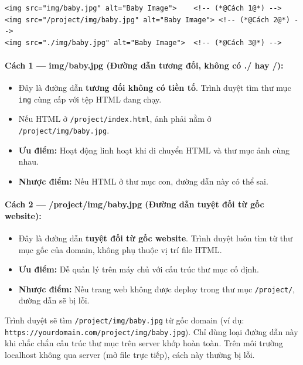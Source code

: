\documentclass[11pt,oneside]{book}
\newcommand{\codeinline}[1]{\textcolor{accentOrange}{\texttt{#1}}}
\begin{document}
\begin{codeWindow}
\begin{lstlisting}[language=HTML5]
<img src="img/baby.jpg" alt="Baby Image">    <!-- (*@Cách 1@*) -->
<img src="/project/img/baby.jpg" alt="Baby Image"> <!-- (*@Cách 2@*) -->
<img src="./img/baby.jpg" alt="Baby Image">  <!-- (*@Cách 3@*) -->
\end{lstlisting}
\end{codeWindow}

\paragraph{Cách 1 — img/baby.jpg (Đường dẫn tương đối, không có ./ hay /):}
\begin{itemize}[leftmargin=1.5em, itemsep=2pt, parsep=0pt]
    \item Đây là đường dẫn \textbf{tương đối không có tiền tố}. Trình duyệt tìm thư mục \codeinline{img} cùng cấp với tệp HTML đang chạy.
    \item Nếu HTML ở \codeinline{/project/index.html}, ảnh phải nằm ở \codeinline{/project/img/baby.jpg}.
    \item \textbf{Ưu điểm:} Hoạt động linh hoạt khi di chuyển HTML và thư mục ảnh cùng nhau.
    \item \textbf{Nhược điểm:} Nếu HTML ở thư mục con, đường dẫn này có thể sai.
\end{itemize}

\paragraph{Cách 2 — /project/img/baby.jpg (Đường dẫn tuyệt đối từ gốc website):}
\begin{itemize}[leftmargin=1.5em, itemsep=2pt, parsep=0pt]
    \item Đây là đường dẫn \textbf{tuyệt đối từ gốc website}. Trình duyệt luôn tìm từ thư mục gốc của domain, không phụ thuộc vị trí file HTML.
    \item \textbf{Ưu điểm:} Dễ quản lý trên máy chủ với cấu trúc thư mục cố định.
    \item \textbf{Nhược điểm:} Nếu trang web không được deploy trong thư mục \codeinline{/project/}, đường dẫn sẽ bị lỗi.
\end{itemize}

\begin{warnBox}
Trình duyệt sẽ tìm \codeinline{/project/img/baby.jpg} từ gốc domain (ví dụ: \codeinline{https://yourdomain.com/project/img/baby.jpg}). Chỉ dùng loại đường dẫn này khi chắc chắn cấu trúc thư mục trên server khớp hoàn toàn. Trên môi trường localhost không qua server (mở file trực tiếp), cách này thường bị lỗi.
\end{warnBox}
\end{document}
